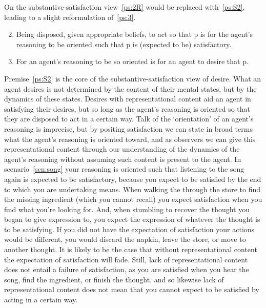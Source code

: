 \documentclass[10pt]{article}
\begin{document}
On the substantive-satisfaction view~\ref{ps:2R} would be replaced with~\ref{ps:S2}, leading to a slight reformulation of~\ref{ps:3}.
\begin{enumerate}[label=\arabic*\(''\)., ref=(\arabic*\(''\))]\setcounter{enumi}{1}
\item\label{ps:S2} Being disposed, given appropriate beliefs, to act so that p is for the agent's reasoning to be oriented such that p is (expected to be) satisfactory.
\item\label{ps:S3} For an agent's reasoning to be so oriented is for an agent to desire that p.
\end{enumerate}
Premise~\ref{ps:S2} is the core of the substantive-satisfaction view of desire.
What an agent desires is not determined by the content of their mental states, but by the dynamics of these states.
Desires with representational content aid an agent in satisfying their desires, but so long as the agent's reasoning is oriented so that they are disposed to act in a certain way.
Talk of the `orientation' of an agent's reasoning is imprecise, but by positing satisfaction we can state in broad terms what the agent's reasoning is oriented toward, and as observers we can give this representational content through our understanding of the dynamics of the agent's reasoning without assuming such content is present to the agent.
In scenario~\ref{scn:song} your reasoning is oriented such that listening to the song again is expected to be satisfactory, because you expect to be satisfied by the end to which you are undertaking means.
When walking the through the store to find the missing ingredient (which you cannot recall) you expect satisfaction when you find what you're looking for.
And, when stumbling to recover the thought you began to give expression to, you expect the expression of whatever the thought is to be satisfying.
If you did not have the expectation of satisfaction your actions would be different, you would discard the napkin, leave the store, or move to another thought.
It is likely to be the case that without representational content the expectation of satisfaction will fade.
Still, lack of representational content does not entail a failure of satisfaction, as you are satisfied when you hear the song, find the ingredient, or finish the thought, and so likewise lack of representational content does not mean that you cannot expect to be satisfied by acting in a certain way.






\newpage
\end{document}
